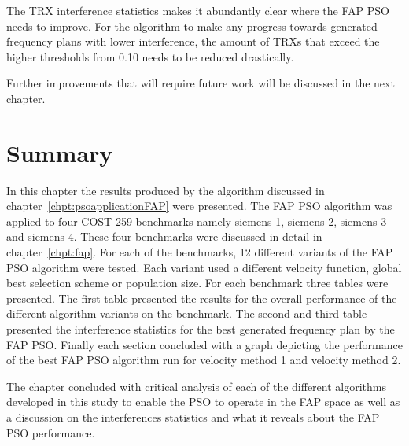The TRX interference statistics makes it abundantly clear where the FAP PSO needs to improve. For the algorithm to make any progress towards generated frequency plans with lower interference, the amount of TRXs that exceed the higher thresholds from 0.10 needs to be reduced drastically.

Further improvements that will require future work will be discussed in the next chapter.

\section{Summary}
In this chapter the results produced by the algorithm discussed in chapter~\ref{chpt:psoapplicationFAP} were presented. The FAP PSO algorithm was applied to four COST 259 benchmarks namely siemens 1, siemens 2, siemens 3 and siemens 4. These four benchmarks were discussed in detail in chapter~\ref{chpt:fap}. For each of the benchmarks, 12 different variants of the FAP PSO algorithm were tested. Each variant used a different velocity function, global best selection scheme or population size. For each benchmark three tables were presented. The first table presented the results for the overall performance of the different algorithm variants on the benchmark. The second and third table presented the interference statistics for the best generated frequency plan by the FAP PSO. Finally each section concluded with a graph depicting the performance of the best FAP PSO algorithm run for velocity method 1 and velocity method 2.

The chapter concluded with critical analysis of each of the different algorithms developed in this study to enable the PSO to operate in the FAP space as well as a discussion on the interferences statistics and what it reveals about the FAP PSO performance.
